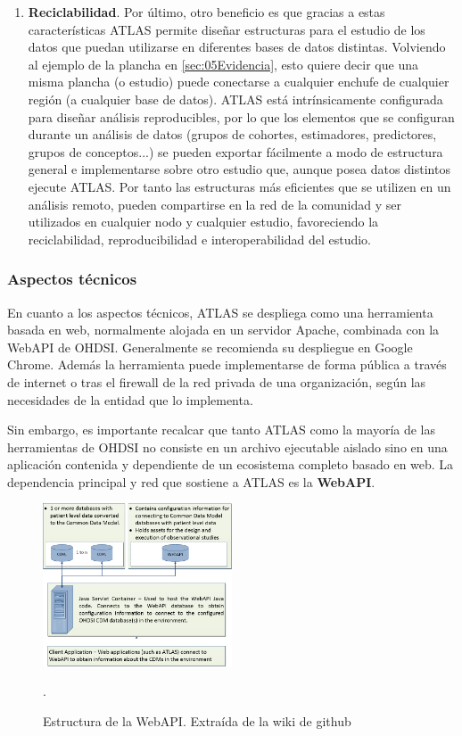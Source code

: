 \begin{enumerate}[label=\roman*.]
     \item \textbf{Reciclabilidad}. Por último, otro beneficio es que gracias a estas características ATLAS permite diseñar estructuras para el estudio de los datos que puedan utilizarse en diferentes bases de datos distintas. Volviendo al ejemplo de la plancha en \ref{sec:05Evidencia}, esto quiere decir que una misma plancha (o estudio) puede conectarse a cualquier enchufe de cualquier región (a cualquier base de datos). ATLAS está intrínsicamente configurada para diseñar análisis reproducibles, por lo que los elementos que se configuran durante un análisis de datos (grupos de cohortes, estimadores, predictores, grupos de conceptos...) se pueden exportar fácilmente a modo de estructura general e implementarse sobre otro estudio que, aunque posea datos distintos ejecute ATLAS. Por tanto las estructuras más eficientes que se utilizen en un análisis remoto, pueden compartirse en la red de la comunidad y ser utilizados en cualquier nodo y cualquier estudio, favoreciendo la reciclabilidad, reproducibilidad e interoperabilidad del estudio.
    
\end{enumerate}

\subsubsection{Aspectos técnicos}

En cuanto a los aspectos técnicos, ATLAS se despliega como una herramienta basada en web, normalmente alojada en un servidor Apache, combinada con la WebAPI de OHDSI. Generalmente se recomienda su despliegue en Google Chrome. Además la herramienta puede implementarse de forma pública a través de internet o tras el firewall de la red privada de una organización, según las necesidades de la entidad que lo implementa.

Sin embargo, es importante recalcar que tanto ATLAS como la mayoría de las herramientas de OHDSI no consiste en un archivo ejecutable aislado sino en una aplicación contenida y dependiente de un ecosistema completo basado en web. La dependencia principal y red que sostiene a ATLAS es la \textbf{WebAPI}.

\begin{figure}[H]
    \centering
    \includegraphics[width=0.50\textwidth]{figures/webAPIwiki.png}
     \caption{Estructura de la WebAPI. Extraída de la wiki de github \cite{githubWebAPIwiki}}.
    \label{fig:webAPIwiki}
\end{figure}

